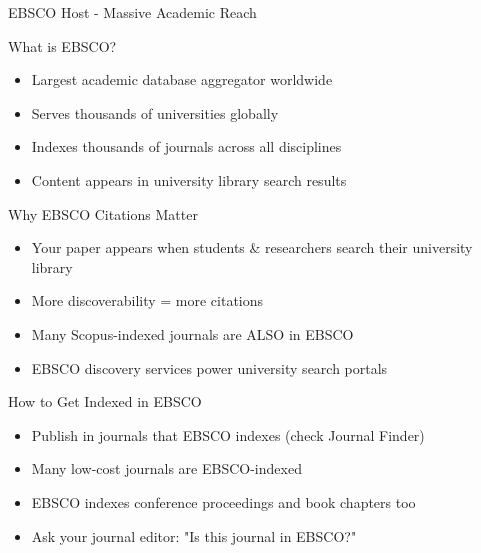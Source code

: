 \documentclass[11pt]{beamer}
\begin{document}
	\begin{frame}{EBSCO Host - Massive Academic Reach}
		\scriptsize
		\begin{block}{What is EBSCO?}
			\begin{itemize}
				\item Largest academic database aggregator worldwide
				\item Serves thousands of universities globally
				\item Indexes thousands of journals across all disciplines
				\item Content appears in university library search results
			\end{itemize}
		\end{block}
		\begin{block}{Why EBSCO Citations Matter}
			\begin{itemize}
				\item Your paper appears when students \& researchers search their university library
				\item More discoverability = more citations
				\item Many Scopus-indexed journals are ALSO in EBSCO
				\item EBSCO discovery services power university search portals
			\end{itemize}
		\end{block}
		\begin{block}{How to Get Indexed in EBSCO}
			\begin{itemize}
				\item Publish in journals that EBSCO indexes (check Journal Finder)
				\item Many low-cost journals are EBSCO-indexed
				\item EBSCO indexes conference proceedings and book chapters too
				\item Ask your journal editor: "Is this journal in EBSCO?"
			\end{itemize}
		\end{block}
	\end{frame}
	
\end{document}
